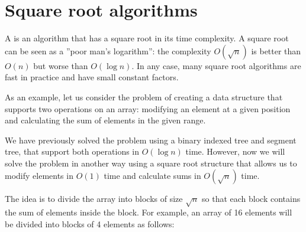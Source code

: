 \chapter{Square root algorithms}


A  is an algorithm
that has a square root in its time complexity.
A square root can be seen as a ''poor man's logarithm'':
the complexity $O(\sqrt n)$ is better than $O(n)$
but worse than $O(\log n)$.
In any case, many square root algorithms are fast in practice
and have small constant factors.

As an example, let us consider the problem of
creating a data structure that supports
two operations on an array:
modifying an element at a given position
and calculating the sum of elements in the given range.

We have previously solved the problem using
a binary indexed tree and segment tree,
that support both operations in $O(\log n)$ time.
However, now we will solve the problem
in another way using a square root structure
that allows us to modify elements in $O(1)$ time
and calculate sums in $O(\sqrt n)$ time.

The idea is to divide the array into blocks
of size $\sqrt n$ so that each block contains
the sum of elements inside the block.
For example, an array of 16 elements will be
divided into blocks of 4 elements as follows:

\begin{center}
\end{center}

